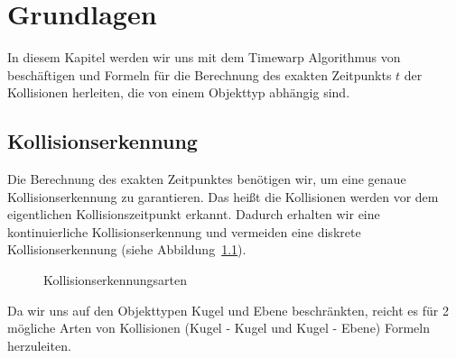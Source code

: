 \documentclass[a4paper, 10pt, openright, parskip, chapterprefix]{scrreprt}
\begin{document}
\newpage
\mbox{}
\thispagestyle{empty}
\newpage
\clearpage
\setcounter{page}{2}
\tableofcontents
\listoffigures
\newpage



\chapter[Grundlagen - D. Kr"umpelmann]{Grundlagen}
In diesem Kapitel werden wir uns mit dem Timewarp Algorithmus von~\cite{timewarp} beschäftigen und
Formeln für die Berechnung des exakten Zeitpunkts $t$ der Kollisionen herleiten, die von einem 
Objekttyp abhängig sind.

\section{Kollisionserkennung}
\label{sec:Kollisionserkennung}
Die Berechnung des exakten Zeitpunktes benötigen wir, um eine genaue Kollisionserkennung zu garantieren. Das heißt die Kollisionen werden vor dem eigentlichen Kollisionszeitpunkt erkannt. Dadurch erhalten wir eine kontinuierliche Kollisionserkennung und vermeiden eine diskrete Kollisionserkennung (siehe Abbildung~\ref{abb:kollkondis}).

\begin{figure}[h!]
\centering{}
\caption{Kollisionserkennungsarten}
\label{abb:kollkondis}
\end{figure}

Da wir uns auf den Objekttypen Kugel und Ebene beschränkten, reicht es für 2 mögliche Arten von Kollisionen 
(Kugel - Kugel und Kugel - Ebene) Formeln herzuleiten.\\
\end{document}
